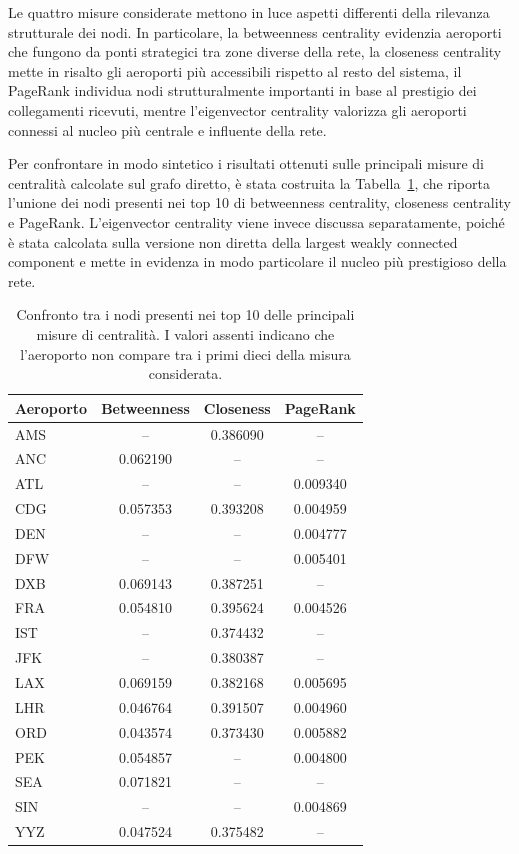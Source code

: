 Le quattro misure considerate mettono in luce aspetti differenti della rilevanza strutturale dei nodi. In particolare, la betweenness centrality evidenzia aeroporti che fungono da ponti strategici tra zone diverse della rete, la closeness centrality mette in risalto gli aeroporti più accessibili rispetto al resto del sistema, il PageRank individua nodi strutturalmente importanti in base al prestigio dei collegamenti ricevuti, mentre l’eigenvector centrality valorizza gli aeroporti connessi al nucleo più centrale e influente della rete.

Per confrontare in modo sintetico i risultati ottenuti sulle principali misure di centralità calcolate sul grafo diretto, è stata costruita la Tabella~\ref{tab:centrality_comparison}, che riporta l’unione dei nodi presenti nei top 10 di betweenness centrality, closeness centrality e PageRank. L’eigenvector centrality viene invece discussa separatamente, poiché è stata calcolata sulla versione non diretta della largest weakly connected component e mette in evidenza in modo particolare il nucleo più prestigioso della rete.

\begin{table}[H]
\centering
\caption{Confronto tra i nodi presenti nei top 10 delle principali misure di centralità. I valori assenti indicano che l’aeroporto non compare tra i primi dieci della misura considerata.}
\label{tab:centrality_comparison}
\begin{tabular}{lccc}
\toprule
\textbf{Aeroporto} & \textbf{Betweenness} & \textbf{Closeness} & \textbf{PageRank} \\
\midrule
AMS & -- & 0.386090 & -- \\
ANC & 0.062190 & -- & -- \\
ATL & -- & -- & 0.009340 \\
CDG & 0.057353 & 0.393208 & 0.004959 \\
DEN & -- & -- & 0.004777 \\
DFW & -- & -- & 0.005401 \\
DXB & 0.069143 & 0.387251 & -- \\
FRA & 0.054810 & 0.395624 & 0.004526 \\
IST & -- & 0.374432 & -- \\
JFK & -- & 0.380387 & -- \\
LAX & 0.069159 & 0.382168 & 0.005695 \\
LHR & 0.046764 & 0.391507 & 0.004960 \\
ORD & 0.043574 & 0.373430 & 0.005882 \\
PEK & 0.054857 & -- & 0.004800 \\
SEA & 0.071821 & -- & -- \\
SIN & -- & -- & 0.004869 \\
YYZ & 0.047524 & 0.375482 & -- \\
\bottomrule
\end{tabular}
\end{table}

